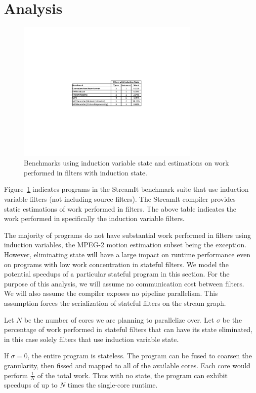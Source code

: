 \section{Analysis}

\begin{figure}[t]
\includegraphics[width=3.5in]{figures/induction-benchmarks.pdf}
\caption{Benchmarks using induction variable state and estimations on work performed in filters with induction state.\protect\label{fig:benchmarks}}
\end{figure}

Figure~\ref{fig:benchmarks} indicates programs in the StreamIt benchmark suite that use induction variable filters (not including source filters).  The StreamIt compiler provides static estimations of work performed in filters.  The above table indicates the work performed in specifically the induction variable filters.

The majority of programs do not have substantial work performed in filters using induction variables, the MPEG-2 motion estimation subset being the exception.  However, eliminating state will have a large impact on runtime performance even on programs with low work concentration in stateful filters.  We model the potential speedups of a particular stateful program in this section.  For the purpose of this analysis, we will assume no communication cost between filters.  We will also assume the compiler exposes no pipeline parallelism.  This assumption forces the serialization of stateful filters on the stream graph.

Let $N$ be the number of cores we are planning to parallelize over.  Let $\sigma$ be the percentage of work performed in stateful filters that can have its state eliminated, in this case solely filters that use induction variable state.  

If $\sigma = 0$, the entire program is stateless.  The program can be fused to coarsen the granularity, then fissed and mapped to all of the available cores.  Each core would perform $\frac{1}{N}$ of the total work.  Thus with no state, the program can exhibit speedups of up to $N$ times the single-core runtime.

